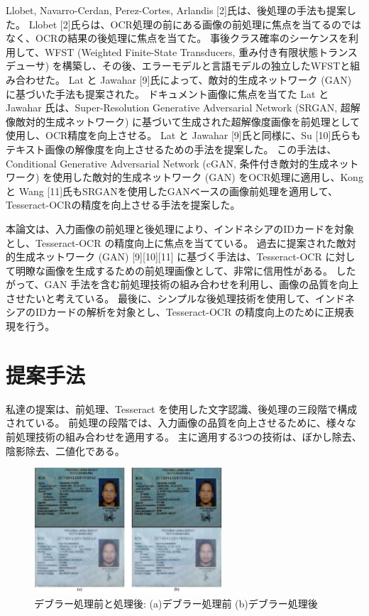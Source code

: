 \documentclass[uplatex, twocolumn,10pt]{jsarticle}
\begin{document}
Llobet, Navarro-Cerdan, Perez-Cortes, Arlandis [2]氏は、後処理の手法も提案した。
Llobet [2]氏らは、OCR処理の前にある画像の前処理に焦点を当てるのではなく、OCRの結果の後処理に焦点を当てた。
事後クラス確率のシーケンスを利用して、WFST (Weighted Finite-State Transducers, 重み付き有限状態トランスデューサ) を構築し、その後、エラーモデルと言語モデルの独立したWFSTと組み合わせた。
Lat と Jawahar [9]氏によって、敵対的生成ネットワーク (GAN) に基づいた手法も提案された。
ドキュメント画像に焦点を当てた Lat と Jawahar 氏は、Super-Resolution Generative Adversarial Network (SRGAN, 超解像敵対的生成ネットワーク) に基づいて生成された超解像度画像を前処理として使用し、OCR精度を向上させる。
Lat と Jawahar [9]氏と同様に、Su [10]氏らもテキスト画像の解像度を向上させるための手法を提案した。
この手法は、Conditional Generative Adversarial Network (cGAN, 条件付き敵対的生成ネットワーク) を使用した敵対的生成ネットワーク (GAN) をOCR処理に適用し、Kong と Wang [11]氏もSRGANを使用したGANベースの画像前処理を適用して、Tesseract-OCRの精度を向上させる手法を提案した。

本論文は、入力画像の前処理と後処理により、インドネシアのIDカードを対象とし、Tesseract-OCR の精度向上に焦点を当てている。
過去に提案された敵対的生成ネットワーク (GAN) [9][10][11] に基づく手法は、Tesseract-OCR に対して明瞭な画像を生成するための前処理画像として、非常に信用性がある。
したがって、GAN 手法を含む前処理技術の組み合わせを利用し、画像の品質を向上させたいと考えている。
最後に、シンプルな後処理技術を使用して、インドネシアのIDカードの解析を対象とし、Tesseract-OCR の精度向上のために正規表現を行う。

\section{提案手法}
私達の提案は、前処理、Tesseract を使用した文字認識、後処理の三段階で構成されている。
前処理の段階では、入力画像の品質を向上させるために、様々な前処理技術の組み合わせを適用する。
主に適用する3つの技術は、ぼかし除去、陰影除去、二値化である。

\begin{figure}[t]
    \begin{center}
        \includegraphics*[width=7cm]{image/Figure1.png}
        \caption{デブラー処理前と処理後: (a)デブラー処理前 (b)デブラー処理後}
        \label{fig:Figure1}
    \end{center}
\end{figure}
\end{document}

